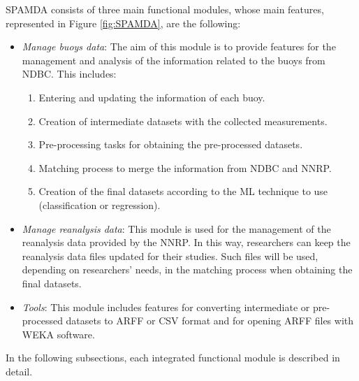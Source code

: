 \documentclass[energies,article,accept,moreauthors,pdftex]{Definitions/mdpi}
\begin{document}
		
		SPAMDA consists of three main functional modules, whose main features, represented in Figure \ref{fig:SPAMDA}, are the following:
		\begin{itemize}
			
			
			\item \textit{Manage buoys data}: The aim of this module is to provide features for the management and analysis of the information related to the buoys from NDBC. This includes:
			\begin{enumerate}
				\item Entering and updating the information of each buoy.
				\item Creation of intermediate datasets with the collected measurements.
				\item Pre-processing tasks for obtaining the pre-processed datasets.
				\item Matching process to merge the information from NDBC and NNRP.
				\item Creation of the final datasets according to the ML technique to use (classification or regression).
			\end{enumerate}
			
			\item \textit{Manage reanalysis data}: This module is used for the management of the reanalysis data provided by the NNRP. In this way, researchers can keep the reanalysis data files updated for their studies. Such files will be used, depending on researchers' needs, in the matching process when obtaining the final datasets.
			
			\item \textit{Tools}: This module includes features for converting intermediate or pre-processed datasets to ARFF or CSV format and for opening ARFF files with WEKA software.
			
		\end{itemize}

		In the following subsections, each integrated functional module is described in detail.
\end{document}
